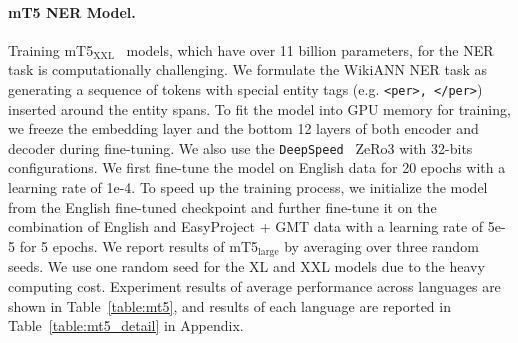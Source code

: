 \documentclass[11pt,dvipsnames]{article}
\begin{document}
\renewcommand{\arraystretch}{1.2}
\begin{table}[t!]
\centering
\small
{}
\vspace{-5pt}
\caption{Hyperparameters for fine-tuning the NER and QA models.}
\label{table:hyperparameters}
\vspace{-18pt}
\end{table}


\paragraph{mT5 NER Model.}
Training  mT5$_{\text{XXL}}$~\citep{xue2021mt5} models, which have over 11 billion parameters, for the NER  task is computationally challenging. 
We formulate the WikiANN NER task as generating a sequence of tokens with special entity tags (e.g. \texttt{<per>, </per>}) inserted around the entity spans.
To fit the model into GPU memory for training, we freeze the embedding layer and the bottom 12 layers of both encoder and decoder during fine-tuning.
We also use the {\tt DeepSpeed}~\citep{deepspeed} ZeRo3 with 32-bits configurations. 
We first fine-tune the model on English data for 20 epochs with a learning rate of 1e-4.
To speed up the training process, we initialize the model from the English fine-tuned checkpoint and further fine-tune it on the combination of English and EasyProject + GMT data with a learning rate of 5e-5 for 5 epochs.
We report results of mT5$_{\text{large}}$ by averaging over three random seeds. We use one random seed for the XL and XXL models due to the heavy computing cost.
Experiment results of average performance across languages are shown in Table~\ref{table:mt5}, and results of each language are reported in Table~\ref{table:mt5_detail} in Appendix. 
\end{document}
